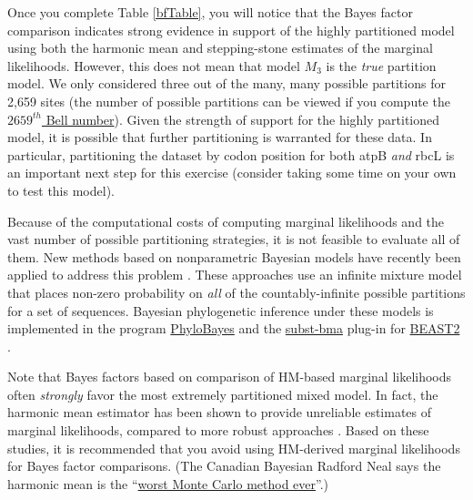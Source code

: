 \documentclass[11pt]{article}
\begin{document}
Once you complete Table \ref{bfTable}, you will notice that the Bayes factor comparison indicates strong evidence in support of the highly partitioned model using both the harmonic mean and stepping-stone estimates of the marginal likelihoods. 
However, this does not mean that model $M_3$ is the \textit{true} partition model.
We only considered three out of the many, many possible partitions for 2,659 sites (the number of possible partitions can be viewed if you compute the \href{http://www.wolframalpha.com/input/?i=bell+number(2659)}{$2659^{th}$ Bell number}). 
Given the strength of support for the highly partitioned model, it is possible that further partitioning is warranted for these data. 
In particular, partitioning the dataset by codon position for both atpB \textit{and} rbcL is an important next step for this exercise (consider taking some time on your own to test this model). 

Because of the computational costs of computing marginal likelihoods and the vast number of possible partitioning strategies, it is not feasible to evaluate all of them. 
New methods based on nonparametric Bayesian models have recently been applied to address this problem \citep{lartillot04,huelsenbeck07b,wuCH2013}. 
These approaches use an infinite mixture model \citep[the Dirichlet process;][]{ferguson73,antoniak74} that places non-zero probability on \textit{all} of the countably-infinite possible partitions for a set of sequences. 
Bayesian phylogenetic inference under these models is implemented in the program \href{http://megasun.bch.umontreal.ca/People/lartillot/www/index.htm}{PhyloBayes} \citep{Lartillot2009} and the \href{https://code.google.com/p/subst-bma/}{subst-bma} plug-in for \href{http://beast2.cs.auckland.ac.nz/index.php/Main_Page}{BEAST2} \citep{wuCH2013}.




Note that Bayes factors based on comparison of HM-based marginal likelihoods 
often \textit{strongly} favor the most extremely partitioned mixed model. 
In fact, the harmonic mean estimator has been shown to provide unreliable estimates of marginal likelihoods, compared to more robust approaches \citep{lartillot06,xie11,fan11}.
Based on these studies, it is recommended that you avoid %
using HM-derived marginal likelihoods for Bayes factor comparisons.
(The Canadian Bayesian Radford Neal says the harmonic mean is the ``\href{http://radfordneal.wordpress.com/2008/08/17/the-harmonic-mean-of-the-likelihood-worst-monte-carlo-method-ever/}{worst Monte Carlo method ever}''.)
\end{document}
